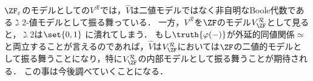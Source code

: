 \documentclass[realisability.tex]{subfiles}
\begin{document}
$\ZFe$のモデルとしての$V^{\mathcal{R}}$では，$\hat{V}$は二値モデルではなく非自明なBoole代数である$\gimel 2$-値モデルとして振る舞っている．
一方，$V^{\mathcal{R}}$を$\ZF$のモデル$V^{\mathcal{R}}_{\ZF}$として見ると，$\gimel 2$は$\set{0, 1}$ に潰れてしまう．
もし$\truth{\varphi(-)}$が外延的同値関係$\simeq$と両立することが言えるのであれば，$\hat{V}$は$V^{\mathcal{R}}_{\ZF}$においては$\ZF$の二値的モデルとして振る舞うことになり，特に$V^{\mathcal{R}}_{\ZF}$の内部モデルとして振る舞うことが期待される．
この事は今後調べていくことになる．
\nocite{Kamo:2007}
\end{document}
